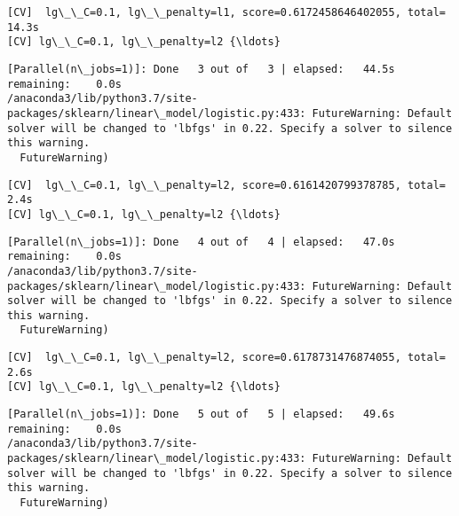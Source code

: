 \documentclass[11pt]{article}
\begin{document}
    \begin{Verbatim}[commandchars=\\\{\}]
[CV]  lg\_\_C=0.1, lg\_\_penalty=l1, score=0.6172458646402055, total=  14.3s
[CV] lg\_\_C=0.1, lg\_\_penalty=l2 {\ldots}

    \end{Verbatim}

    \begin{Verbatim}[commandchars=\\\{\}]
[Parallel(n\_jobs=1)]: Done   3 out of   3 | elapsed:   44.5s remaining:    0.0s
/anaconda3/lib/python3.7/site-packages/sklearn/linear\_model/logistic.py:433: FutureWarning: Default solver will be changed to 'lbfgs' in 0.22. Specify a solver to silence this warning.
  FutureWarning)

    \end{Verbatim}

    \begin{Verbatim}[commandchars=\\\{\}]
[CV]  lg\_\_C=0.1, lg\_\_penalty=l2, score=0.6161420799378785, total=   2.4s
[CV] lg\_\_C=0.1, lg\_\_penalty=l2 {\ldots}

    \end{Verbatim}

    \begin{Verbatim}[commandchars=\\\{\}]
[Parallel(n\_jobs=1)]: Done   4 out of   4 | elapsed:   47.0s remaining:    0.0s
/anaconda3/lib/python3.7/site-packages/sklearn/linear\_model/logistic.py:433: FutureWarning: Default solver will be changed to 'lbfgs' in 0.22. Specify a solver to silence this warning.
  FutureWarning)

    \end{Verbatim}

    \begin{Verbatim}[commandchars=\\\{\}]
[CV]  lg\_\_C=0.1, lg\_\_penalty=l2, score=0.6178731476874055, total=   2.6s
[CV] lg\_\_C=0.1, lg\_\_penalty=l2 {\ldots}

    \end{Verbatim}

    \begin{Verbatim}[commandchars=\\\{\}]
[Parallel(n\_jobs=1)]: Done   5 out of   5 | elapsed:   49.6s remaining:    0.0s
/anaconda3/lib/python3.7/site-packages/sklearn/linear\_model/logistic.py:433: FutureWarning: Default solver will be changed to 'lbfgs' in 0.22. Specify a solver to silence this warning.
  FutureWarning)

    \end{Verbatim}
\end{document}
